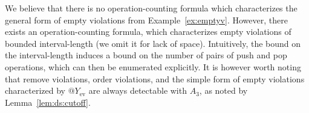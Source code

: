 We believe that there is no operation-counting formula which characterizes the
general form of empty violations from Example~\ref{ex:emptyv}. \alert{However, there
exists an operation-counting formula, which characterizes empty violations of bounded
interval-length (we omit it for lack of space). Intuitively, the bound on the interval-length induces
a bound on the number of pairs of {\sf push} and {\sf pop} operations, which can then be enumerated
explicitly}. It is however
worth noting that remove violations, order violations, and the simple form of
empty violations characterized by $@Y_\mathrm{ev}$ are always detectable with
$A_3$, as noted by Lemma~\ref{lem:ds:cutoff}.
